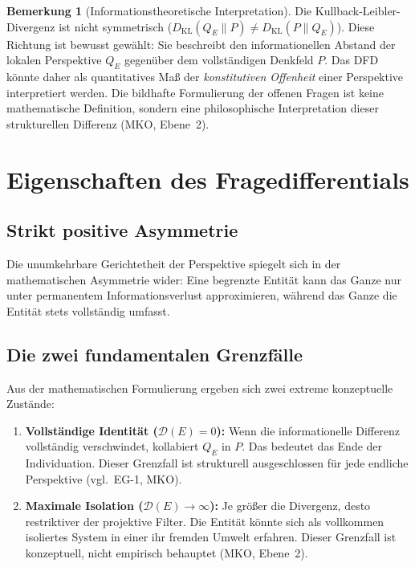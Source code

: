 \documentclass[11pt,a4paper]{article}
\theoremstyle{plain}
\theoremstyle{definition}
\newtheorem{remark}{Bemerkung}[section]
\begin{document}
\begin{remark}[Informationstheoretische Interpretation]
Die Kullback-Leibler-Divergenz ist nicht symmetrisch
($D_{\mathrm{KL}}(Q_E \| P) \neq D_{\mathrm{KL}}(P \| Q_E)$). Diese Richtung ist
bewusst gew\"{a}hlt: Sie beschreibt den informationellen Abstand der lokalen Perspektive
$Q_E$ gegen\"{u}ber dem vollst\"{a}ndigen Denkfeld $P$. Das DFD k\"{o}nnte daher als
quantitatives Ma\ss{} der \emph{konstitutiven Offenheit} einer Perspektive interpretiert
werden. Die bildhafte Formulierung der \glqq{}offenen Fragen\grqq{} ist keine
mathematische Definition, sondern eine philosophische Interpretation dieser strukturellen
Differenz (MKO, Ebene~2).
\end{remark}

\section{Eigenschaften des Fragedifferentials}

\subsection{Strikt positive Asymmetrie}

Die unumkehrbare Gerichtetheit der Perspektive spiegelt sich in der mathematischen
Asymmetrie wider: Eine begrenzte Entit\"{a}t kann das Ganze nur unter permanentem
Informationsverlust approximieren, w\"{a}hrend das Ganze die Entit\"{a}t stets
vollst\"{a}ndig umfasst.

\subsection{Die zwei fundamentalen Grenzf\"{a}lle}

Aus der mathematischen Formulierung ergeben sich zwei extreme konzeptuelle Zust\"{a}nde:

\begin{enumerate}
  \item \textbf{Vollst\"{a}ndige Identit\"{a}t ($\mathcal{D}(E) = 0$):} Wenn die
        informationelle Differenz vollst\"{a}ndig verschwindet, kollabiert $Q_E$ in $P$.
        Das bedeutet das Ende der Individuation. Dieser Grenzfall ist strukturell
        ausgeschlossen f\"{u}r jede endliche Perspektive (vgl.\ EG-1, MKO).

  \item \textbf{Maximale Isolation ($\mathcal{D}(E) \to \infty$):} Je gr\"{o}\ss{}er
        die Divergenz, desto restriktiver der projektive Filter. Die Entit\"{a}t
        k\"{o}nnte sich als vollkommen isoliertes System in einer ihr fremden Umwelt
        erfahren. Dieser Grenzfall ist konzeptuell, nicht empirisch behauptet
        (MKO, Ebene~2).
\end{enumerate}
\end{document}
